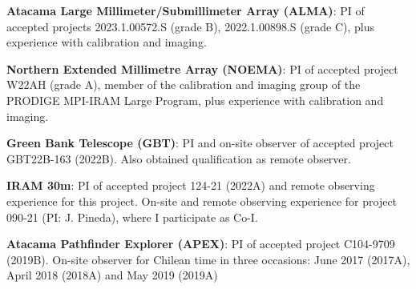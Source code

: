 \vspace{8pt}

\begin{cvparagraph}
	
\textbf{Atacama Large Millimeter/Submillimeter Array (ALMA)}: %
{PI of accepted projects 2023.1.00572.S (grade B), 2022.1.00898.S (grade C), plus experience with calibration and imaging.} %

\textbf{Northern Extended Millimetre Array (NOEMA)}: %
{PI of accepted project W22AH (grade A), member of the calibration and imaging group of the PRODIGE MPI-IRAM Large Program, plus experience with calibration and imaging.} %
	
\textbf{Green Bank Telescope (GBT)}: %
{PI and on-site observer of accepted project GBT22B-163 (2022B). Also obtained qualification as remote observer.} 

\textbf{IRAM 30m}: %
{PI of accepted project 124-21 (2022A) and remote observing experience for this project. On-site and remote observing experience for project 090-21 (PI: J. Pineda), where I participate as Co-I.} %

\textbf{Atacama Pathfinder Explorer (APEX)}: %
{PI of accepted project C104-9709 (2019B). On-site observer for Chilean time in three occasions: June 2017 (2017A), April 2018 (2018A) and May 2019 (2019A)} 

\end{cvparagraph}

%
%	
%	
%
%	
%	
